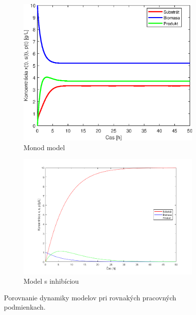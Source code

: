\begin{figure}
	\begin{subfigure}{.5\textwidth}
		\centering
		\includegraphics[width=1\linewidth]{images/dyn_Monod}
		\caption[]{Monod model}
	\end{subfigure}
	\begin{subfigure}{.5\textwidth}
		\centering
		\includegraphics[width=1\linewidth]{images/dyn_inhb}
		\caption[]{Model s inhibíciou}
	\end{subfigure}
	\caption{Porovnanie dynamiky modelov pri rovnakých pracovných podmienkach.}
	\label{fig:3}
\end{figure}
